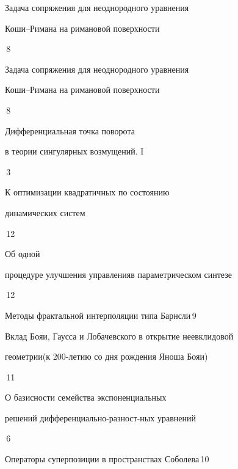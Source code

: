 

{Задача сопряжения для неоднородного уравнения\newline


Коши--Римана на римановой поверхности}{\No\,8}




{Задача сопряжения для неоднородного уравнения\newline


Коши--Римана на римановой поверхности}{\No\,8}






{Дифференциальная точка поворота


в теории сингулярных возмущений. I}{\No\,3}






{К оптимизации квадратичных по состоянию


динамических систем}{\No\,12}




{Об одной 


процедуре улучшения управления\newline в параметрическом синтезе}{\No\,12}




{Методы фрактальной интерполяции типа Барнсли}{\No\,9}




{Вклад Бояи, Гаусса и Лобачевского в открытие неевклидовой


геометрии\newline (к 200-летию со дня рождения Яноша Бояи)}{\No\,11}




{О базисности семейства экспоненциальных  


решений дифференциально-разност-\newline ных уравнений}{\No\,6}




{Операторы суперпозиции в пространствах Соболева}{\No\,10}




